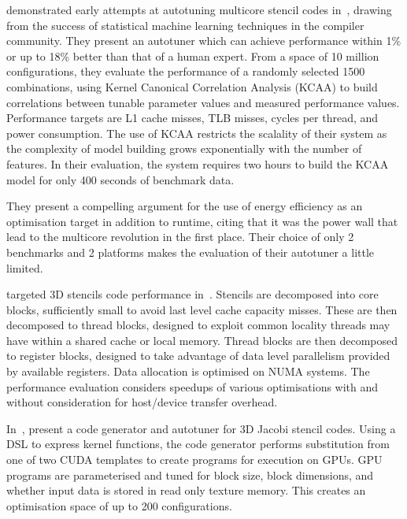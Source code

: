\citeauthor{Ganapathi2009} demonstrated early attempts at autotuning
multicore stencil codes in~\cite{Ganapathi2009}, drawing from the
success of statistical machine learning techniques in the compiler
community. They present an autotuner which can achieve performance
within 1\% or up to 18\% better than that of a human expert. From a
space of 10 million configurations, they evaluate the performance of a
randomly selected 1500 combinations, using Kernel Canonical
Correlation Analysis (KCAA) to build correlations between tunable
parameter values and measured performance values. Performance targets
are L1 cache misses, TLB misses, cycles per thread, and power
consumption. The use of KCAA restricts the scalality of their system
as the complexity of model building grows exponentially with the
number of features. In their evaluation, the system requires two hours
to build the KCAA model for only 400 seconds of benchmark data.

They present a compelling argument for the use of energy efficiency as
an optimisation target in addition to runtime, citing that it was the
power wall that lead to the multicore revolution in the first
place. Their choice of only 2 benchmarks and 2 platforms makes the
evaluation of their autotuner a little limited.

\citeauthor{Berkeley2009} targeted 3D stencils code performance
in~\cite{Berkeley2009}. Stencils are decomposed into core blocks,
sufficiently small to avoid last level cache capacity misses. These
are then decomposed to thread blocks, designed to exploit common
locality threads may have within a shared cache or local
memory. Thread blocks are then decomposed to register blocks, designed
to take advantage of data level parallelism provided by available
registers. Data allocation is optimised on NUMA systems. The
performance evaluation considers speedups of various optimisations
with and without consideration for host/device transfer overhead.


In~\cite{Zhang2013a}, \citeauthor{Zhang2013a} present a code generator
and autotuner for 3D Jacobi stencil codes. Using a DSL to express
kernel functions, the code generator performs substitution from one of
two CUDA templates to create programs for execution on GPUs. GPU
programs are parameterised and tuned for block size, block dimensions,
and whether input data is stored in read only texture memory. This
creates an optimisation space of up to 200 configurations.

